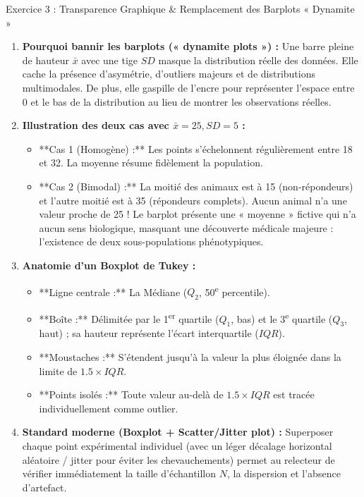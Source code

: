 \documentclass[11pt,a4paper]{article}
\begin{document}
\begin{solutionbox}{Exercice 3 : Transparence Graphique \& Remplacement des Barplots « Dynamite »}
\begin{enumerate}[label=\textbf{\alph*.}]
  \item \textbf{Pourquoi bannir les barplots (« dynamite plots ») :}
  Une barre pleine de hauteur $\bar{x}$ avec une tige $SD$ masque la distribution réelle des données. Elle cache la présence d'asymétrie, d'outliers majeurs et de distributions multimodales. De plus, elle gaspille de l'encre pour représenter l'espace entre 0 et le bas de la distribution au lieu de montrer les observations réelles.

  \item \textbf{Illustration des deux cas avec $\bar{x} = 25, SD = 5$ :}
  \begin{itemize}
    \item **Cas 1 (Homogène) :** Les points s'échelonnent régulièrement entre 18 et 32. La moyenne résume fidèlement la population.
    \item **Cas 2 (Bimodal) :** La moitié des animaux est à 15 (non-répondeurs) et l'autre moitié est à 35 (répondeurs complets). Aucun animal n'a une valeur proche de 25 ! Le barplot présente une « moyenne » fictive qui n'a aucun sens biologique, masquant une découverte médicale majeure : l'existence de deux sous-populations phénotypiques.
  \end{itemize}

  \item \textbf{Anatomie d'un Boxplot de Tukey :}
  \begin{itemize}
    \item **Ligne centrale :** La Médiane ($Q_2$, 50\textsuperscript{e} percentile).
    \item **Boîte :** Délimitée par le 1\textsuperscript{er} quartile ($Q_1$, bas) et le 3\textsuperscript{e} quartile ($Q_3$, haut) ; sa hauteur représente l'écart interquartile ($IQR$).
    \item **Moustaches :** S'étendent jusqu'à la valeur la plus éloignée dans la limite de $1.5 \times IQR$.
    \item **Points isolés :** Toute valeur au-delà de $1.5 \times IQR$ est tracée individuellement comme outlier.
  \end{itemize}

  \item \textbf{Standard moderne (Boxplot + Scatter/Jitter plot) :}
  Superposer chaque point expérimental individuel (avec un léger décalage horizontal aléatoire / jitter pour éviter les chevauchements) permet au relecteur de vérifier immédiatement la taille d'échantillon $N$, la dispersion et l'absence d'artefact.
\end{enumerate}
\end{solutionbox}
\end{document}
